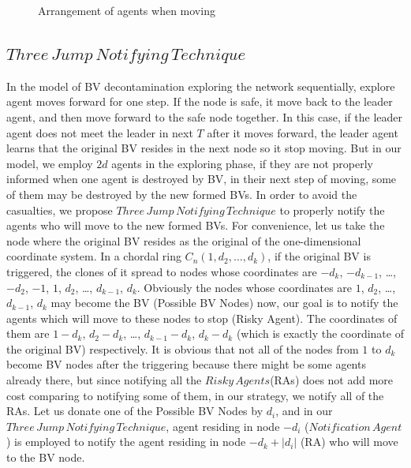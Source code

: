 \documentclass[conference]{IEEEtran}
\begin{document}
\begin{figure}
  \centering 
  \hspace{1in} 
  \caption{Arrangement of agents when moving} 
  \label{fig:subfig1} %
\end{figure}


\subsection{$Three\,Jump\,Notifying\,Technique$}
In the model of BV decontamination exploring the network sequentially, explore agent moves forward for one step. If the node is safe, it move back to the leader agent, and then move forward to the safe node together. In this case, if the leader agent does not meet the leader in next $T$ after it moves forward, the leader agent learns that the original BV resides in the next node so it stop moving. 
But in our model, we employ $2d$ agents in the exploring phase, if they are not properly informed when one agent is destroyed by BV, in their next step of moving, some of them may be destroyed by the new formed BVs. In order to avoid the casualties, we propose $Three\,Jump\,Notifying\,Technique$ to properly notify the agents who will move to the new formed BVs.
For convenience, let us take the node where the original BV resides as the original of the one-dimensional coordinate system. In a chordal ring $C_n(1, d_2, \ldots,  d_k)$, if the original BV is triggered, the clones of it spread to nodes whose coordinates are $-d_k$, $-d_{k-1}$, \ldots, $-d_2$, $-1$, $1$, $d_2$, \ldots, $d_{k-1}$, $d_k$. Obviously the nodes whose coordinates are $1$, $d_2$, \dots, $d_{k-1}$, $d_k$ may become the BV (Possible BV Nodes) now, our goal is to notify the agents which will move to these nodes to stop (Risky Agent). The coordinates of them are $1- d_k$, $d_2-d_k$, \ldots, $d_{k-1}-d_k$, $d_k-d_k$ (which is exactly the coordinate of the original BV) respectively. It is obvious that not all of the nodes from $1$ to $d_k$ become BV nodes after the triggering because there might be some agents already there, but since notifying all the $Risky\,Agents$(RAs) does not add more cost comparing to notifying some of them, in our strategy, we notify all of the RAs. Let us donate one of the Possible BV Nodes by $d_i$, and in our $Three\,Jump\,Notifying\,Technique$, agent residing in node $-d_i$ ($Notification\,Agent$) is employed to notify the agent residing in node $-d_k+\left |d_i\right |$ (RA) who will move to the BV node. 
\end{document}
